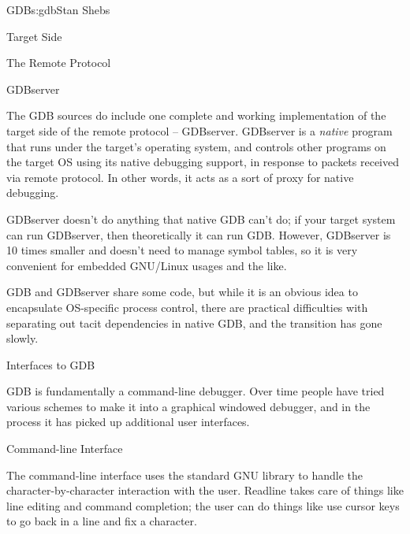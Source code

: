 \begin{aosachapter}{GDB}{s:gdb}{Stan Shebs}
\begin{aosasect1}{Target Side}
\begin{aosasect2}{The Remote Protocol}
\end{aosasect2}

\begin{aosasect2}{GDBserver}

The GDB sources do include one complete and working implementation of
the target side of the remote protocol -- GDBserver.  GDBserver is a
{\em native} program that runs under the target's operating system,
and controls other programs on the target OS using its native
debugging support, in response to packets received via remote protocol.
In other words, it acts as a sort of proxy for native debugging.

GDBserver doesn't do anything that native GDB can't do; if your target
system can run GDBserver, then theoretically it can run GDB.  However,
GDBserver is 10 times smaller and doesn't need to manage symbol
tables, so it is very convenient for embedded GNU/Linux usages and the
like.


GDB and GDBserver share some code, but while it is an obvious idea to
encapsulate OS-specific process control, there are practical difficulties
with separating out tacit dependencies in native GDB, and the transition
has gone slowly.

\end{aosasect2}

\end{aosasect1}

\begin{aosasect1}{Interfaces to GDB}

GDB is fundamentally a command-line debugger.  Over time people have
tried various schemes to make it into a graphical windowed debugger,
and in the process it has picked up additional user interfaces.

\begin{aosasect2}{Command-line Interface}

The command-line interface uses the standard GNU library
 to handle the character-by-character interaction with
the user.  Readline takes care of things like line editing and command
completion; the user can do things like use cursor keys to go back in
a line and fix a character.


\end{aosasect2}
\end{aosasect1}
\end{aosachapter}
